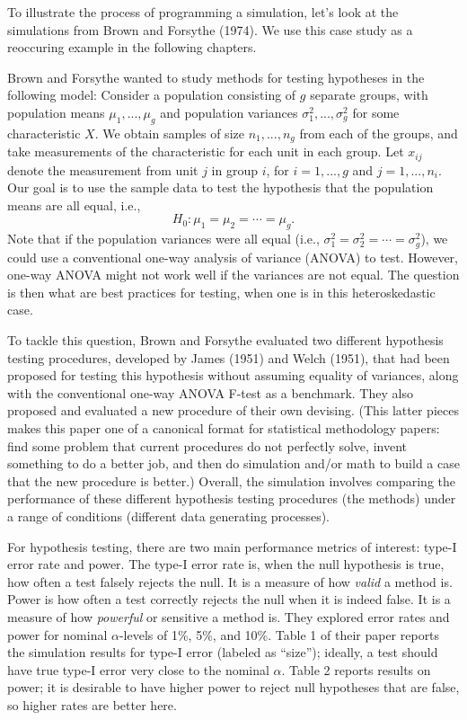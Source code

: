 \documentclass[
]{book}
\begin{document}
To illustrate the process of programming a simulation, let's look at the simulations from Brown and Forsythe (1974).
We use this case study as a reoccuring example in the following chapters.

Brown and Forsythe wanted to study methods for testing hypotheses in the following model: Consider a population consisting of \(g\) separate groups, with population means \(\mu_1,...,\mu_g\) and population variances \(\sigma_1^2,...,\sigma_g^2\) for some characteristic \(X\). We obtain samples of size \(n_1,...,n_g\) from each of the groups, and take measurements of the characteristic for each unit in each group. Let \(x_{ij}\) denote the measurement from unit \(j\) in group \(i\), for \(i = 1,...,g\) and \(j = 1,...,n_i\). Our goal is to use the sample data to test the hypothesis that the population means are all equal, i.e.,
\[
H_0: \mu_1 = \mu_2 = \cdots = \mu_g.
\]
Note that if the population variances were all equal (i.e., \(\sigma_1^2 = \sigma_2^2 = \cdots = \sigma_g^2\)), we could use a conventional one-way analysis of variance (ANOVA) to test.
However, one-way ANOVA might not work well if the variances are not equal.
The question is then what are best practices for testing, when one is in this heteroskedastic case.

To tackle this question, Brown and Forsythe evaluated two different hypothesis testing procedures, developed by James (1951) and Welch (1951), that had been proposed for testing this hypothesis without assuming equality of variances, along with the conventional one-way ANOVA F-test as a benchmark.
They also proposed and evaluated a new procedure of their own devising.
(This latter pieces makes this paper one of a canonical format for statistical methodology papers: find some problem that current procedures do not perfectly solve, invent something to do a better job, and then do simulation and/or math to build a case that the new procedure is better.)
Overall, the simulation involves comparing the performance of these different hypothesis testing procedures (the methods) under a range of conditions (different data generating processes).

For hypothesis testing, there are two main performance metrics of interest: type-I error rate and power.
The type-I error rate is, when the null hypothesis is true, how often a test falsely rejects the null.
It is a measure of how \emph{valid} a method is.
Power is how often a test correctly rejects the null when it is indeed false.
It is a measure of how \emph{powerful} or sensitive a method is.
They explored error rates and power for nominal \(\alpha\)-levels of 1\%, 5\%, and 10\%.
Table 1 of their paper reports the simulation results for type-I error (labeled as ``size''); ideally, a test should have true type-I error very close to the nominal \(\alpha\).
Table 2 reports results on power; it is desirable to have higher power to reject null hypotheses that are false, so higher rates are better here.
\end{document}
